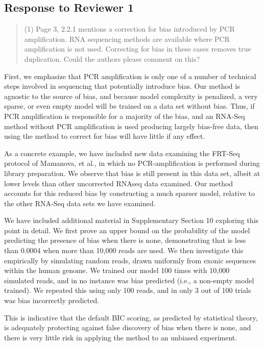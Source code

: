 \documentclass{article}
\begin{document}
\subsection*{Response to Reviewer 1}

\begin{quote}
(1) Page 3, 2.2.1 mentions a correction for bias introduced by PCR amplification.
RNA sequencing methods are available where PCR amplification is not used.
Correcting for bias in these cases removes true duplication.  Could the authors
please comment on this?
\end{quote}

First, we emphasize that PCR amplification is only one of a number of technical steps
involved in sequencing that potentially introduce bias.  Our method is agnostic
to the source of bias, and because model complexity is penalized, a very sparse,
or even empty model will be trained on a data set without bias.  Thus, if PCR
amplification is responsible for a majority of the bias, and an RNA-Seq method
without PCR amplification is used producing largely bias-free data, then using
the method to correct for bias will have little if any effect.

As a concrete example, we have included new data examining the FRT-Seq protocol
of Mamanova, et al., in which no PCR-amplification is performed during library
preparation. We observe that bias is still present in this data set, albeit at
lower levels than other uncorrected RNAseq data examined.  Our method accounts
for this reduced bias by constructing a much sparser model, relative to the
other RNA-Seq data sets we have examined.

We have included additional material in Supplementary Section 10 exploring this
point in detail. We first prove an upper bound on the probability of the model
predicting the presence of bias when there is none, demonstrating that is less
than 0.0004 when more than 10,000 reads are used. We then investigate this
empirically by simulating random reads, drawn uniformly from exonic sequences
within the human genome.  We trained our model 100 times with 10,000 simulated
reads, and in no instance was bias predicted (i.e., a non-empty model trained).
We repeated this using only 100 reads, and in only 3 out of 100 trials was
bias incorrectly predicted.

This is indicative that the default BIC scoring, as predicted by statistical
theory, is adequately protecting against false discovery of bias when there is
none, and there is very little risk in applying the method to an unbiased
experiment.
\end{document}
